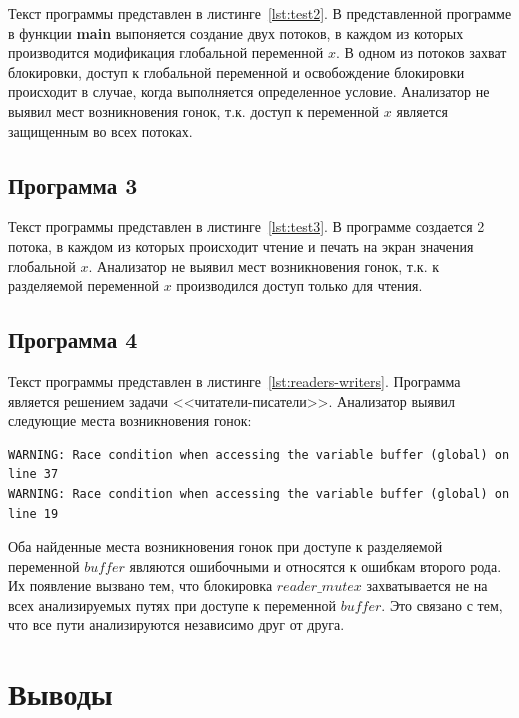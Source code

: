 Текст программы представлен в листинге~\ref{lst:test2}. В представленной программе в функции \textbf{main} выпоняется создание двух потоков, в каждом из которых производится модификация глобальной переменной $x$. В одном из потоков захват блокировки, доступ к глобальной переменной и освобождение блокировки происходит в случае, когда выполняется определенное условие. Анализатор не выявил мест возникновения гонок, т.к. доступ к переменной $x$ является защищенным во всех потоках.



\subsection{Программа 3}

Текст программы представлен в листинге~\ref{lst:test3}. В программе создается 2 потока, в каждом из которых происходит чтение и печать на экран значения глобальной $x$. Анализатор не выявил мест возникновения гонок, т.к. к разделяемой переменной $x$ производился доступ только для чтения.



\subsection{Программа 4}

Текст программы представлен в листинге~\ref{lst:readers-writers}. Программа является решением задачи <<читатели-писатели>>. Анализатор выявил следующие места возникновения гонок:
\begin{verbatim}
WARNING: Race condition when accessing the variable buffer (global) on line 37
WARNING: Race condition when accessing the variable buffer (global) on line 19
\end{verbatim}
Оба найденные места возникновения гонок при доступе к разделяемой переменной $buffer$ являются ошибочными и относятся к ошибкам второго рода. Их появление вызвано тем, что блокировка $reader\_mutex$ захватывается не на всех анализируемых путях при доступе к переменной $buffer$. Это связано с тем, что все пути анализируются независимо друг от друга.

\section{Выводы}

